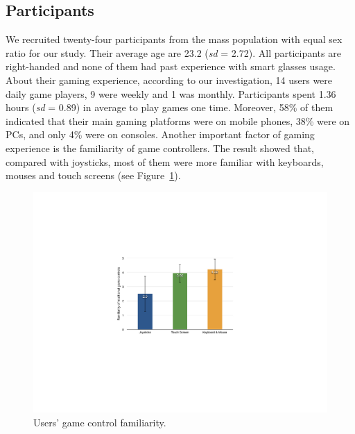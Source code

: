\documentclass{sigchi}
\begin{document}
  \subsection {Participants}
  We recruited twenty-four participants from the mass population with equal sex ratio for our study. Their average age are 23.2 (\textsl{sd} = 2.72). All participants are right-handed and none of them had past experience with smart glasses usage. About their gaming experience, according to our investigation, 14 users were daily game players, 9 were weekly and 1 was monthly. Participants spent 1.36 hours (\textsl{sd} = 0.89) in average to play games one time. Moreover, 58\% of them indicated that their main gaming platforms were on mobile phones, 38\% were on PCs, and only 4\% were on consoles. Another important factor of gaming experience is the familiarity of game controllers. The result showed that, compared with joysticks, most of them were more familiar with keyboards, mouses and touch screens (see Figure~\ref{fig:figureFamiliarity}).
  \begin{figure}[!h]
  \centering
  \includegraphics[width=1\columnwidth]{Familiarity.pdf}
  \caption{Users' game control familiarity.}
  \label{fig:figureFamiliarity}
  \end{figure}   
\end{document}
